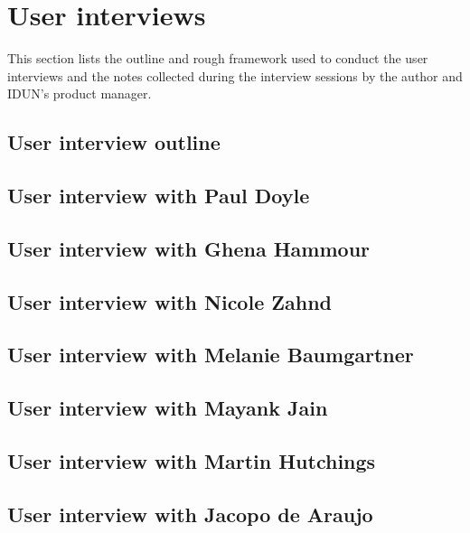 \chapter{User interviews}
\label{appendix3-user-interviews}

This section lists the outline and rough framework used to conduct the user interviews and the notes collected during the interview sessions by the author and IDUN's product manager.

\section*{User interview outline}

\section*{User interview with Paul Doyle}

\section*{User interview with Ghena Hammour}

\section*{User interview with Nicole Zahnd}

\section*{User interview with Melanie Baumgartner}

\section*{User interview with Mayank Jain}

\section*{User interview with Martin Hutchings}

\section*{User interview with Jacopo de Araujo}

